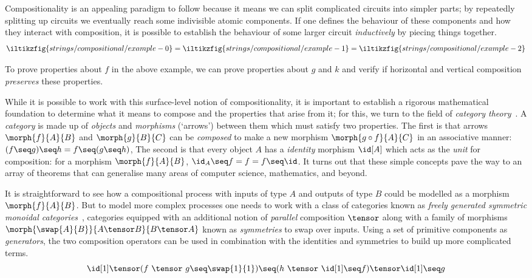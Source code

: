 Compositionality is an appealing paradigm to follow because it means we can
split complicated circuits into simpler parts; by repeatedly splitting up
circuits we eventually reach some indivisible atomic components.
If one defines the behaviour of these components and how they interact
with composition, it is possible to establish the behaviour of some
larger circuit \emph{inductively} by piecing things together.
\[
    \iltikzfig{strings/compositional/example-0}
    =
    \iltikzfig{strings/compositional/example-1}
    =
    \iltikzfig{strings/compositional/example-2}
\]

To prove properties about \(f\) in the above example, we can prove properties
about \(g\) and \(k\) and verify if horizontal and vertical composition
\emph{preserves} these properties.

While it is possible to work with this surface-level notion of
compositionality, it is important to establish a rigorous mathematical
foundation to determine what it means to compose and the properties that
arise from it; for this, we turn to the field of
\emph{category theory}~\cite{maclane1978categories}.
A \emph{category} is made up of \emph{objects} and \emph{morphisms} (`arrows')
between them which must satisfy two properties.
The first is that arrows \(\morph{f}{A}{B}\) and \(\morph{g}{B}{C}\) can be
\emph{composed} to make a new morphism \(\morph{g \circ f}{A}{C}\) in an
associative manner: \((f \seq g) \seq h = f \seq (g \seq h)\),
The second is that every object \(A\) has a \emph{identity} morphism \(\id[A]\)
which acts as the \emph{unit} for composition: for a morphism
\(\morph{f}{A}{B}\), \(\id_A \seq f = f = f \seq \id\).
It turns out that these simple concepts pave the way to an array of
theorems that can generalise many areas of computer science, mathematics, and
beyond.

It is straightforward to see how a compositional process with inputs of type
\(A\) and outputs of type \(B\) could be modelled as a morphism
\(\morph{f}{A}{B}\).
But to model more complex processes one needs to work with a class of categories
known as
\emph{freely generated symmetric monoidal categories}~\cite{maclane1963natural},
categories equipped with an additional notion of \emph{parallel} composition
\(\tensor\) along with a family of morphisms
\(\morph{\swap{A}{B}}{A\tensor B}{B \tensor A}\) known as \emph{symmetries} to
swap over inputs.
Using a set of primitive components as \emph{generators}, the two composition
operators can be used in combination with the identities and symmetries to build
up more complicated terms.
\[
    \id[1]
    \tensor
    (f\ \tensor\ g
    \seq
    \swap{1}{1}
    )
    \seq
    (h\ \tensor\ \id[1] \seq f)
    \tensor
    \id[1]
    \seq
    g
\]

